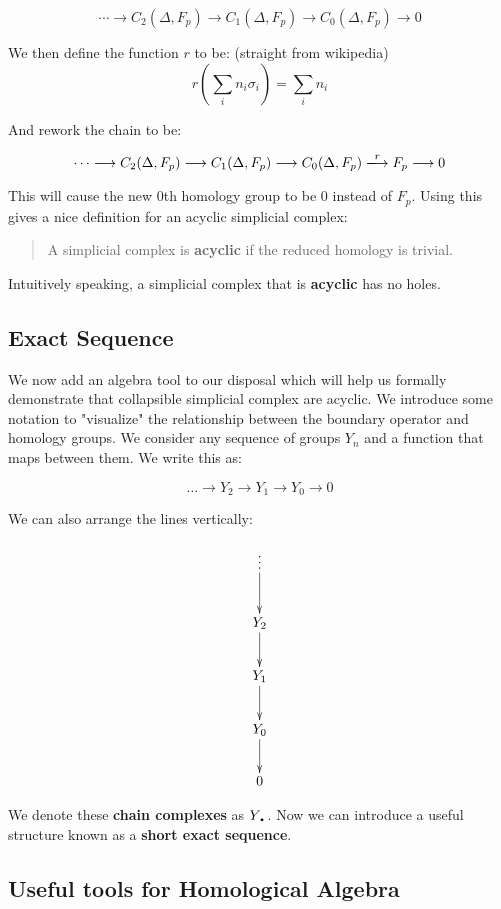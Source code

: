\documentclass[letterpaper,12pt]{article}
\newcommand{\lra}{\longrightarrow}
\newcommand{\xlra}{\xlongrightarrow}
\newcommand{\tb}{\text{\textbullet}}
\begin{document}
$$\cdots \lra C_2(\Delta, F_p) \lra C_1(\Delta, F_p) \lra C_0(\Delta, F_p) \lra 0$$

We then define the function $r$ to be: (straight from wikipedia)
$$r\left(\sum_i n_i \sigma_i\right) = \sum_i n_i$$

And rework the chain to be:

$$\cdots \lra C_2(\Delta, F_p) \lra C_1(\Delta, F_p) \lra C_0(\Delta, F_p) \xlra{r} F_p \lra 0$$

This will cause the new $0$th homology group to be $0$ instead of $F_p$. Using this gives a nice definition for an acyclic simplicial complex:

\begin{quote}
    A simplicial complex is \textbf{acyclic} if the reduced homology is trivial.
\end{quote}

Intuitively speaking, a simplicial complex that is \textbf{acyclic} has no holes.

\subsection{Exact Sequence}

We now add an algebra tool to our disposal which will help us formally demonstrate that collapsible simplicial complex are acyclic. We introduce some notation to "visualize" the relationship between the boundary operator and homology groups. We consider any sequence of groups $Y_n$ and a function that maps between them. We write this as:

$$\ldots \longrightarrow Y_2 \rightarrow Y_1 \rightarrow Y_0 \rightarrow 0 $$

We can also arrange the lines vertically:

\begin{displaymath}
    \xymatrix{\vdots \ar[d] \\ Y_2 \ar[d] \\ Y_1 \ar[d] \\ Y_0 \ar[d] \\ 0 }
\end{displaymath}

We denote these \textbf{chain complexes} as $Y_{\tb}$. Now we can introduce a useful structure known as a \textbf{short exact sequence}.

\subsection{Useful tools for Homological Algebra}
\end{document}
